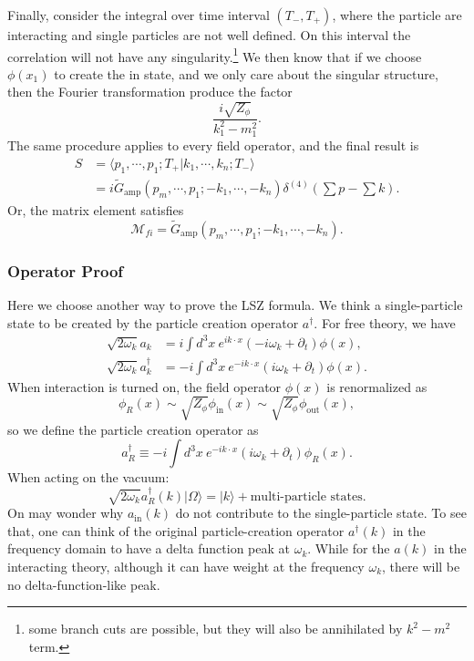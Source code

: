 \documentclass[aps,prb,superscriptaddress,nofootinbib]{revtex4}
\begin{document}
Finally, consider the integral over time interval $(T_-,T_+)$, where the particle are interacting and single particles are not well defined.
On this interval the correlation will not have any singularity.\footnote{some branch cuts are possible, but they will also be annihilated by $k^2-m^2$ term.}
We then know that if we choose $\phi(x_1)$ to create the in state, and we only care about the singular structure, then the Fourier transformation produce the factor
\begin{equation}
	\frac{i\sqrt{Z_\phi}}{k_1^2-m_1^2}.
\end{equation}
The same procedure applies to every field operator, and the final result is
\begin{equation}
\begin{aligned}
	S &= \langle p_1,\cdots,p_1;T_+|k_1,\cdots,k_n;T_-\rangle \\
	&= i\tilde{G}_{\mathrm{amp}}(p_m,\cdots,p_1;-k_1,\cdots,-k_n) \delta^{(4)}\left(\sum p-\sum k \right).
\end{aligned}
\end{equation}
Or, the matrix element satisfies
\begin{equation}
	\mathcal M_{fi} = \tilde{G}_{\mathrm{amp}}(p_m,\cdots,p_1;-k_1,\cdots,-k_n).
\end{equation}


\subsubsection{Operator Proof}
Here we choose another way to prove the LSZ formula.
We think a single-particle state to be created by the particle creation operator $a^\dagger$.
For free theory, we have
\begin{equation}
\begin{aligned}
	\sqrt{2\omega_k} a_k &= i \int d^3 x\ e^{ik\cdot x}(-i\omega_k+\partial_t)\phi(x), \\
	\sqrt{2\omega_k} a^\dagger_k &= -i \int d^3 x\ e^{-ik\cdot x}(i\omega_k+\partial_t)\phi(x).
\end{aligned}
\end{equation}
When interaction is turned on, the field operator $\phi(x)$ is renormalized as
\begin{equation*}
	\phi_R(x) \sim \sqrt{Z_{\phi}} \phi_{\mathrm{in}}(x) \sim \sqrt{Z_{\phi}} \phi_{\mathrm{out}}(x),
\end{equation*}
so we define the particle creation operator as
\begin{equation}
	a_R^\dagger \equiv -i \int d^3 x\ e^{-ik\cdot x}(i\omega_k+\partial_t)\phi_R(x).
\end{equation}
When acting on the vacuum:
\begin{equation}
	\sqrt{2\omega_k} a_R^\dagger(k) |\Omega\rangle = |k\rangle + \text{multi-particle states}.
\end{equation}
On may wonder why $a_{\mathrm{in}}(k)$ do not contribute to the single-particle state. 
To see that, one can think of the original particle-creation operator $a^\dagger(k)$ in the frequency domain to have a delta function peak at $\omega_k$.
While for the $a(k)$ in the interacting theory, although it can have weight at the frequency $\omega_k$, there will be no delta-function-like peak.
\end{document}
